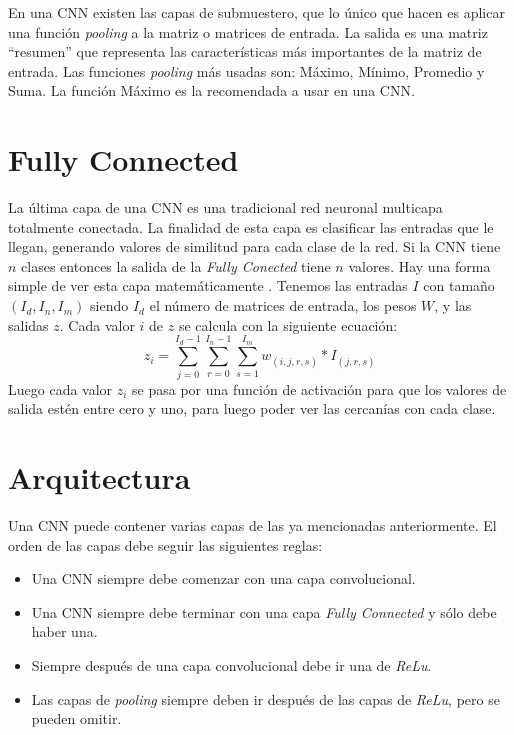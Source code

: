 \documentclass[a4paper,12pt]{article}
\begin{document}
En una CNN existen las capas de submuestero, que lo único que hacen es aplicar una función \textit{pooling} a la matriz o matrices de entrada. La salida es una matriz ``resumen'' que
representa las características más importantes de la matriz de entrada. Las funciones \textit{pooling} más usadas son: Máximo,
Mínimo, Promedio y Suma. La función Máximo es la recomendada a usar en una CNN.

\section{Fully Connected}

La última capa de una CNN es una tradicional red neuronal multicapa totalmente conectada. La finalidad de esta capa es clasificar
las entradas que le llegan, generando valores de similitud para cada clase de la red. Si la CNN tiene $n$ clases entonces la salida
de la \textit{Fully Conected} tiene $n$ valores. Hay una forma simple de ver esta capa matemáticamente \cite{Stutz}. Tenemos las entradas $I$
con tamaño $(I_{d},I_{n},I_{m})$ siendo $I_{d}$ el número de matrices de entrada, los pesos $W$, y las salidas $z$. Cada valor $i$
de $z$  se calcula con la siguiente ecuación:
\begin{equation}
 z_{i} = \sum_{j=0}^{I_{d}-1}\sum_{r=0}^{I_{n}-1}\sum_{s=1}^{I_{m}}w_{(i,j,r,s)}*I_{(j,r,s)}
\end{equation}
Luego cada valor $z_{i}$ se pasa por una función de activación para que los valores de salida estén entre cero y uno, para luego
poder ver las cercanías con cada clase.

\section{Arquitectura}

Una CNN puede contener varias capas de las ya mencionadas anteriormente. El orden de las capas debe seguir las
siguientes reglas:
\begin{itemize}
 \item Una CNN siempre debe comenzar con una capa convolucional.
 \item Una CNN siempre debe terminar con una capa \textit{Fully Connected} y sólo debe haber una.
 \item Siempre después de una capa convolucional debe ir una de \textit{ReLu}.
 \item Las capas de \textit{pooling} siempre deben ir después de las capas de \textit{ReLu}, pero se pueden omitir.
\end{itemize}
\end{document}
